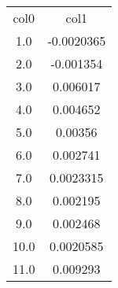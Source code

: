 \begin{table}
\begin{tabular}{cc}
col0 & col1 \\
1.0 & -0.0020365 \\
2.0 & -0.001354 \\
3.0 & 0.006017 \\
4.0 & 0.004652 \\
5.0 & 0.00356 \\
6.0 & 0.002741 \\
7.0 & 0.0023315 \\
8.0 & 0.002195 \\
9.0 & 0.002468 \\
10.0 & 0.0020585 \\
11.0 & 0.009293 \\
\end{tabular}
\end{table}
